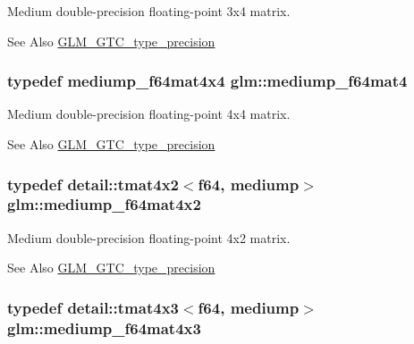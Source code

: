 Medium double-\/precision floating-\/point 3x4 matrix. \begin{DoxySeeAlso}{See Also}
\hyperlink{group__gtc__type__precision}{G\-L\-M\-\_\-\-G\-T\-C\-\_\-type\-\_\-precision} 
\end{DoxySeeAlso}
\hypertarget{group__gtc__type__precision_ga2763f655bfe2141a014e66d26a9d2f18}{
\subsubsection[{mediump\-\_\-f64mat4}]{\setlength{\rightskip}{0pt plus 5cm}typedef mediump\-\_\-f64mat4x4 {\bf glm\-::mediump\-\_\-f64mat4}}}\label{group__gtc__type__precision_ga2763f655bfe2141a014e66d26a9d2f18}
Medium double-\/precision floating-\/point 4x4 matrix. \begin{DoxySeeAlso}{See Also}
\hyperlink{group__gtc__type__precision}{G\-L\-M\-\_\-\-G\-T\-C\-\_\-type\-\_\-precision} 
\end{DoxySeeAlso}
\hypertarget{group__gtc__type__precision_ga4a7a2b6889f08c9209a4f994fd87cc4e}{
\subsubsection[{mediump\-\_\-f64mat4x2}]{\setlength{\rightskip}{0pt plus 5cm}typedef detail\-::tmat4x2$<$f64, mediump$>$ {\bf glm\-::mediump\-\_\-f64mat4x2}}}\label{group__gtc__type__precision_ga4a7a2b6889f08c9209a4f994fd87cc4e}
Medium double-\/precision floating-\/point 4x2 matrix. \begin{DoxySeeAlso}{See Also}
\hyperlink{group__gtc__type__precision}{G\-L\-M\-\_\-\-G\-T\-C\-\_\-type\-\_\-precision} 
\end{DoxySeeAlso}
\hypertarget{group__gtc__type__precision_ga4a920abfb082b0ffd8d89614cb787021}{
\subsubsection[{mediump\-\_\-f64mat4x3}]{\setlength{\rightskip}{0pt plus 5cm}typedef detail\-::tmat4x3$<$f64, mediump$>$ {\bf glm\-::mediump\-\_\-f64mat4x3}}}\label{group__gtc__type__precision_ga4a920abfb082b0ffd8d89614cb787021}
